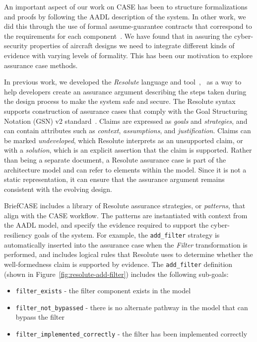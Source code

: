 An important aspect of our work on CASE has been to structure formalizations and proofs by following the AADL description of the system. In other work, we did this through the use of formal assume-guarantee contracts that correspond to the requirements for each component~\cite{HACMS}. We have found that in assuring the cyber-security properties of aircraft designs we need to integrate different kinds of evidence with varying levels of formality. This has been our motivation to explore assurance case methods.

In previous work, we developed the {\em Resolute} language and tool~\cite{resolute2014},~\cite{resolute-destion} as a way to help developers create an assurance argument describing the steps taken during the design process to make the system safe and secure.  
The Resolute syntax supports construction of assurance cases that comply with the Goal Structuring Notation (GSN) v2 standard~\cite{GSNv2}.  Claims are expressed as \textit{goals} and \textit{strategies}, and can contain attributes such as \textit{context}, \textit{assumptions}, and \textit{justification}.  Claims can be marked \textit{undeveloped}, which Resolute interprets as an unsupported claim, or with a \textit{solution}, which is an explicit assertion that the claim is supported.
Rather than being a separate document, a Resolute assurance case is part of the architecture model and can refer to elements within the model. Since it is not a static representation, it can ensure that the assurance argument remains consistent with the evolving design.

BriefCASE includes a library of Resolute assurance strategies, or \textit{patterns}, that align with the CASE workflow.  The patterns are instantiated with context from the AADL model, and specify the evidence required to support the cyber-resiliency goals of the system.  
%
For example, the \texttt{add\_filter} strategy is automatically inserted into the assurance case when the \textit{Filter} transformation is performed, and includes logical rules that Resolute uses to determine whether the well-formedness claim is  supported by evidence.
The \texttt{add\_filter} definition (shown in Figure~\ref{fig:resolute-add-filter}) includes the following sub-goals: 
\begin{itemize}
	\item \texttt{filter\_exists} - the filter component exists in the model
	\item \texttt{filter\_not\_bypassed} -  there is no alternate pathway in the model that can bypass the filter
	\item \texttt{filter\_implemented\_correctly} - the filter has been implemented correctly
\end{itemize}


